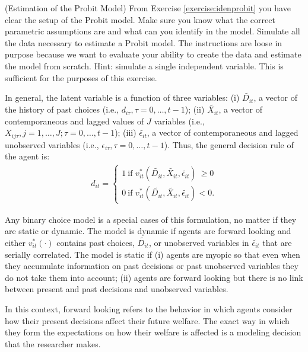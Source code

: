 \begin{exercise} (Estimation of the Probit Model)
From Exercise \ref{exercise:idenprobit} you have clear the setup of the Probit model. Make sure you know what the correct parametric assumptions are and what can you identify in the model. Simulate all the data necessary to estimate a Probit model. The instructions are loose in purpose because we want to evaluate your ability to create the data and estimate the model from scratch. Hint: simulate a single independent variable. This is sufficient for the purposes of this exercise.
\end{exercise}

\indent In general, the latent variable is a function of three variables: (i) $\tilde{D_{it}}$, a vector of the history of past choices (i.e., $d_{i\tau}, \tau = 0, \ldots, t-1$); (ii) $\tilde{X_{it}}$, a vector of contemporaneous and lagged values of $J$ variables (i.e., $X_{ij\tau},  j = 1, \ldots, J; \tau = 0, \ldots, t-1$); (iii) $\tilde{\epsilon_{it}}$, a vector of contemporaneous and lagged  unobserved variables (i.e., $\epsilon_{i\tau}, \tau = 0, \ldots, t-1$). Thus, the general decision rule of the agent is:
\begin{eqnarray}
d_{it} =
\begin{cases}
1 \  \text{if }  v_{it}^* \left( \tilde{D_{it}}, \tilde{X_{it}}, \tilde{\epsilon_{it}} \right) \ \geq 0  \\
0 \  \text{if }  v_{it}^* \left( \tilde{D_{it}}, \tilde{X_{it}}, \tilde{\epsilon_{it}} \right)  < 0. \label{eq:latent}
\end{cases}
\end{eqnarray}

\indent Any binary choice model is a special cases of this formulation, no matter if they are static or dynamic. The model is dynamic if agents are forward looking and either $v_{it}^* (\cdot)$ contains past choices, $\tilde{D_{it}}$, or unobserved variables in $\tilde{\epsilon_{it}}$ that are serially correlated. The model is static if (i) agents are myopic so that even when they accumulate information on past decisions or past unobserved variables they do not take them into account; (ii) agents are forward looking but there is no link between present and past decisions and unobserved variables.

\begin{remark}
In this context, forward looking refers to the behavior in which agents consider how their present decisions affect their future welfare. The exact way in which they form the expectations on how their welfare is affected is a modeling decision that the researcher makes.
\end{remark}

